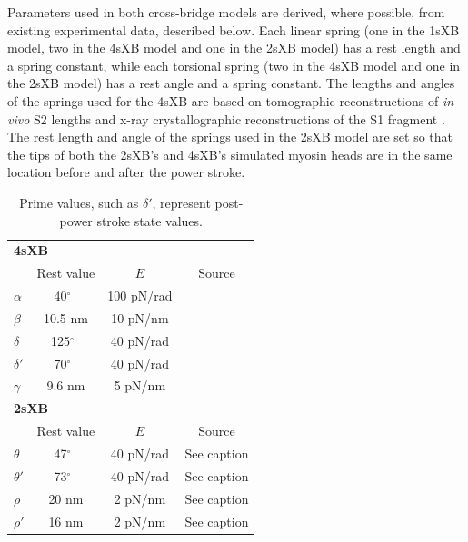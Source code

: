 \documentclass[]{article}
\newcommand{\de}{$^\circ$~} %
\begin{document}
Parameters used in both cross-bridge models are derived, where possible, from existing experimental data, described below.  
Each linear spring (one in the 1sXB model, two in the 4sXB model and one in the 2sXB model) has a rest length and a spring constant, while each torsional spring (two in the 4sXB model and one in the 2sXB model) has a rest angle and a spring constant. 
The lengths and angles of the springs used for the 4sXB are based on tomographic reconstructions of \emph{in vivo} S2 lengths and x-ray crystallographic reconstructions of the S1 fragment \citep{Taylor1999, Rayment1993}.
The rest length and angle of the springs used in the 2sXB model are set so that the tips of both the 2sXB's and 4sXB's simulated myosin heads are in the same location before and after the power stroke.

\begin{table}[ft]
    \begin{center}
    \begin{tabular}[t]{|l|ccc|} \hline
    \multicolumn{4}{|l|}{\textbf{4sXB}} \\ 
    \multicolumn{1}{|l}{~} 
              & Rest value & $E$        & Source \\ \cline{2-4}  
    $\alpha$  & 40\de      & 100 pN/rad & \citet{Liu2006}      \\
    $\beta$   & 10.5 nm    & 10 pN/nm   & \citet{Liu2006}      \\
    $\delta$  & 125\de     & 40 pN/rad  & \citet{Taylor1999}   \\
    $\delta'$ & 70\de      & 40 pN/rad  & \citet{Taylor1999}   \\
    $\gamma$  & 9.6 nm     & 5 pN/nm    & \citet{Houdusse2000} \\ \hline
    \multicolumn{4}{|l|}{\textbf{2sXB}} \\ 
    \multicolumn{1}{|l}{~} 
              & Rest value & $E$        & Source      \\ \cline{2-4} 
    $\theta$  & 47\de      & 40 pN/rad  & See caption \\
    $\theta'$ & 73\de      & 40 pN/rad  & See caption \\
    $\rho$    & 20 nm      & 2 pN/nm    & See caption \\
    $\rho'$   & 16 nm      & 2 pN/nm    & See caption \\ \hline
    \end{tabular}
    \end{center}
    \caption{ 
    \label{parameter_table}
    Prime values, such as $\delta'$, represent post-power stroke state values. 
}
\end{table}
\end{document}
